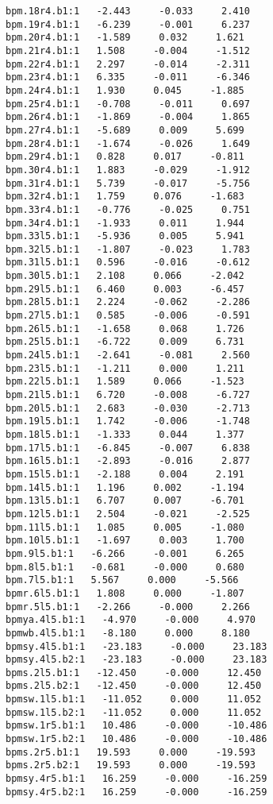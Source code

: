 \begin{verbatim}
bpm.18r4.b1:1   -2.443     -0.033     2.410
bpm.19r4.b1:1   -6.239     -0.001     6.237
bpm.20r4.b1:1   -1.589     0.032     1.621
bpm.21r4.b1:1   1.508     -0.004     -1.512
bpm.22r4.b1:1   2.297     -0.014     -2.311
bpm.23r4.b1:1   6.335     -0.011     -6.346
bpm.24r4.b1:1   1.930     0.045     -1.885
bpm.25r4.b1:1   -0.708     -0.011     0.697
bpm.26r4.b1:1   -1.869     -0.004     1.865
bpm.27r4.b1:1   -5.689     0.009     5.699
bpm.28r4.b1:1   -1.674     -0.026     1.649
bpm.29r4.b1:1   0.828     0.017     -0.811
bpm.30r4.b1:1   1.883     -0.029     -1.912
bpm.31r4.b1:1   5.739     -0.017     -5.756
bpm.32r4.b1:1   1.759     0.076     -1.683
bpm.33r4.b1:1   -0.776     -0.025     0.751
bpm.34r4.b1:1   -1.933     0.011     1.944
bpm.33l5.b1:1   -5.936     0.005     5.941
bpm.32l5.b1:1   -1.807     -0.023     1.783
bpm.31l5.b1:1   0.596     -0.016     -0.612
bpm.30l5.b1:1   2.108     0.066     -2.042
bpm.29l5.b1:1   6.460     0.003     -6.457
bpm.28l5.b1:1   2.224     -0.062     -2.286
bpm.27l5.b1:1   0.585     -0.006     -0.591
bpm.26l5.b1:1   -1.658     0.068     1.726
bpm.25l5.b1:1   -6.722     0.009     6.731
bpm.24l5.b1:1   -2.641     -0.081     2.560
bpm.23l5.b1:1   -1.211     0.000     1.211
bpm.22l5.b1:1   1.589     0.066     -1.523
bpm.21l5.b1:1   6.720     -0.008     -6.727
bpm.20l5.b1:1   2.683     -0.030     -2.713
bpm.19l5.b1:1   1.742     -0.006     -1.748
bpm.18l5.b1:1   -1.333     0.044     1.377
bpm.17l5.b1:1   -6.845     -0.007     6.838
bpm.16l5.b1:1   -2.893     -0.016     2.877
bpm.15l5.b1:1   -2.188     0.004     2.191
bpm.14l5.b1:1   1.196     0.002     -1.194
bpm.13l5.b1:1   6.707     0.007     -6.701
bpm.12l5.b1:1   2.504     -0.021     -2.525
bpm.11l5.b1:1   1.085     0.005     -1.080
bpm.10l5.b1:1   -1.697     0.003     1.700
bpm.9l5.b1:1   -6.266     -0.001     6.265
bpm.8l5.b1:1   -0.681     -0.000     0.680
bpm.7l5.b1:1   5.567     0.000     -5.566
bpmr.6l5.b1:1   1.808     0.000     -1.807
bpmr.5l5.b1:1   -2.266     -0.000     2.266
bpmya.4l5.b1:1   -4.970     -0.000     4.970
bpmwb.4l5.b1:1   -8.180     0.000     8.180
bpmsy.4l5.b1:1   -23.183     -0.000     23.183
bpmsy.4l5.b2:1   -23.183     -0.000     23.183
bpms.2l5.b1:1   -12.450     -0.000     12.450
bpms.2l5.b2:1   -12.450     -0.000     12.450
bpmsw.1l5.b1:1   -11.052     0.000     11.052
bpmsw.1l5.b2:1   -11.052     0.000     11.052
bpmsw.1r5.b1:1   10.486     -0.000     -10.486
bpmsw.1r5.b2:1   10.486     -0.000     -10.486
bpms.2r5.b1:1   19.593     0.000     -19.593
bpms.2r5.b2:1   19.593     0.000     -19.593
bpmsy.4r5.b1:1   16.259     -0.000     -16.259
bpmsy.4r5.b2:1   16.259     -0.000     -16.259

\end{verbatim}
